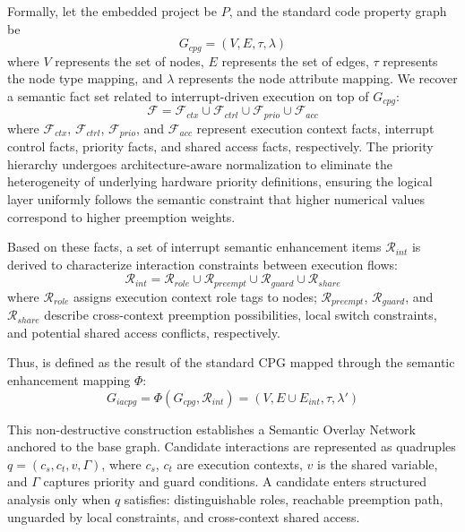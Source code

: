 \documentclass[a4paper,UKenglish,cleveref, autoref, thm-restate]{lipics-v2021}
\begin{document}
Formally, let the embedded project be $P$, and the standard code property graph be
\begin{equation}
G_{cpg}=(V,E,\tau,\lambda)
\end{equation}
where $V$ represents the set of nodes, $E$ represents the set of edges, $\tau$ represents the node type mapping, and $\lambda$ represents the node attribute mapping. We recover a semantic fact set related to interrupt-driven execution on top of $G_{cpg}$:
\begin{equation}
\mathcal{F}=\mathcal{F}_{ctx}\cup \mathcal{F}_{ctrl}\cup \mathcal{F}_{prio}\cup \mathcal{F}_{acc}
\end{equation}
where $\mathcal{F}_{ctx}$, $\mathcal{F}_{ctrl}$, $\mathcal{F}_{prio}$, and $\mathcal{F}_{acc}$ represent execution context facts, interrupt control facts, priority facts, and shared access facts, respectively. The priority hierarchy undergoes architecture-aware normalization to eliminate the heterogeneity of underlying hardware priority definitions, ensuring the logical layer uniformly follows the semantic constraint that higher numerical values correspond to higher preemption weights.

Based on these facts, a set of interrupt semantic enhancement items $\mathcal{R}_{int}$ is derived to characterize interaction constraints between execution flows:
\begin{equation}
\mathcal{R}_{int} = \mathcal{R}_{role}\cup \mathcal{R}_{preempt}\cup  \mathcal{R}_{guard}\cup \mathcal{R}_{share}
\end{equation}
where $\mathcal{R}_{role}$ assigns execution context role tags to nodes; $\mathcal{R}_{preempt}$, $\mathcal{R}_{guard}$, and $\mathcal{R}_{share}$ describe cross-context preemption possibilities, local switch constraints, and potential shared access conflicts, respectively.

Thus, \iacpg is defined as the result of the standard CPG mapped through the semantic enhancement mapping $\Phi$:
\begin{equation}
G_{iacpg} = \Phi(G_{cpg}, \mathcal{R}_{int}) = (V, E \cup E_{int}, \tau, \lambda')
\end{equation}

This non-destructive construction establishes a Semantic Overlay Network anchored to the base graph. Candidate interactions are represented as quadruples $q=(c_s,c_t,v,\Gamma)$, where $c_s$, $c_t$ are execution contexts, $v$ is the shared variable, and $\Gamma$ captures priority and guard conditions. A candidate enters structured analysis only when $q$ satisfies: distinguishable roles, reachable preemption path, unguarded by local constraints, and cross-context shared access.
\end{document}
